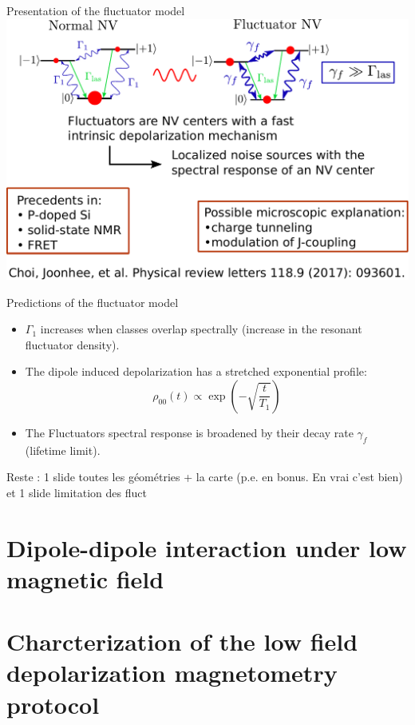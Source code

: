 \documentclass{beamer}
\begin{document}
\begin{frame}{Presentation of the fluctuator model}
\centering
\includegraphics[width=\textwidth,height=0.8\textheight,keepaspectratio]{Slide_fluct_intro}
\end{frame}

\begin{frame}{Predictions of the fluctuator model}
\begin{itemize}
\item $\Gamma_1$ increases when classes overlap spectrally (increase in the resonant fluctuator density).
\item The dipole induced depolarization has a stretched exponential profile:
$$ \rho_{00}(t) \propto \exp(-\sqrt{\frac{t}{T_1}})$$
\item The Fluctuators spectral response is broadened by their decay rate $\gamma_f$ (lifetime limit).
\end{itemize}
\end{frame}

Reste : 1 slide toutes les géométries + la carte (p.e. en bonus. En vrai c'est bien) et 1 slide limitation des fluct

\section{Dipole-dipole interaction under low magnetic field}

\section{Charcterization of the low field depolarization magnetometry protocol}
\end{document}
